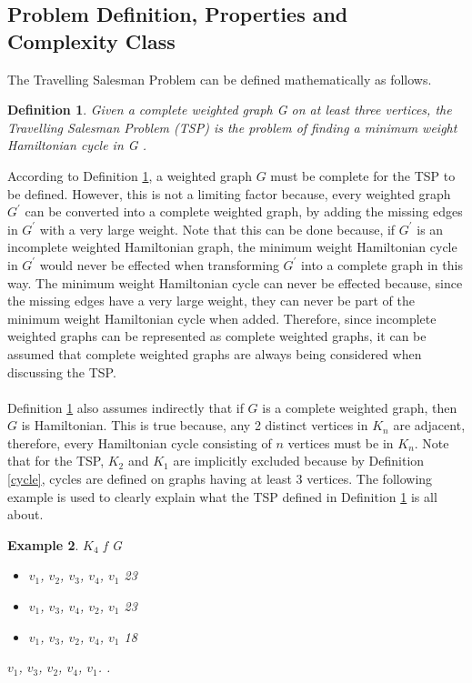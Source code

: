\documentclass[12pt]{article}
\newtheorem{definition}{Definition}[subsection]
\newtheorem{example}[definition]{Example}
\numberwithin{equation}{subsection}
\numberwithin{table}{subsection}
\numberwithin{algorithm}{subsection}
\begin{document}
\subsection{Problem Definition, Properties and Complexity Class}
The Travelling Salesman Problem can be defined mathematically as follows.
\begin{definition}
\label{TSP}
Given a complete weighted graph G on at least three vertices, the Travelling Salesman Problem (TSP) is the problem of finding a minimum weight Hamiltonian cycle in G {}.
\end{definition}
According to Definition \ref{TSP}, a weighted graph $\mathit{G}$ must be complete for the TSP to be defined. However, this is not a limiting factor because, every weighted graph $\mathit{G^\prime}$ can be converted into a complete weighted graph, by adding the missing edges in $\mathit{G^\prime}$ with a very large weight. Note that this can be done because, if $\mathit{G^\prime}$ is an incomplete weighted Hamiltonian graph, the minimum weight Hamiltonian cycle in $\mathit{G^\prime}$ would never be effected when transforming $\mathit{G^\prime}$ into a complete graph in this way. The minimum weight Hamiltonian cycle can never be effected because, since the missing edges have a very large weight, they can never be part of the minimum weight Hamiltonian cycle when added. Therefore, since incomplete weighted graphs can be represented as complete weighted graphs, it can be assumed that complete weighted graphs are always being considered when discussing the TSP.\\\\
Definition \ref{TSP} also assumes indirectly that if $\mathit{G}$ is a complete weighted graph, then $\mathit{G}$ is Hamiltonian. This is true because, any 2 distinct vertices in $K_n$ are adjacent, therefore, every Hamiltonian cycle consisting of $n$ vertices must be in $K_n$. Note that for the TSP, $K_2$ and $K_1$ are implicitly excluded because by Definition \ref{cycle}, cycles are defined on graphs having at least 3 vertices. The following example is used to clearly explain what the TSP defined in Definition \ref{TSP} is all about.
\begin{example}
\label{example_2.1}
{} $K_4$ {} f {} G {}
\begin{itemize}
   \item $v_1$, $v_2$, $v_3$, $v_4$, $v_1$ {} 23
   \item $v_1$, $v_3$, $v_4$, $v_2$, $v_1$ {} 23
   \item $v_1$, $v_3$, $v_2$, $v_4$, $v_1$ {} 18
\end{itemize} 
{} $v_1$, $v_3$, $v_2$, $v_4$, $v_1$. {}. 
\end{example}
\end{document}
